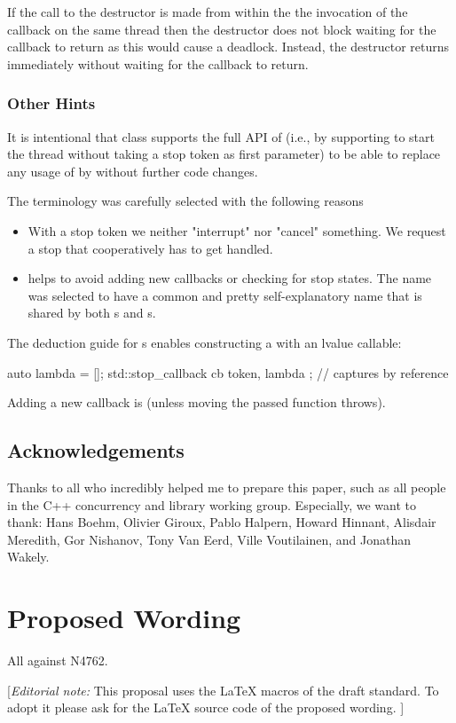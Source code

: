 If the call to the  destructor is made from within the the
invocation of the callback on the same thread then the destructor does not block
waiting for the callback to return as this would cause a deadlock. Instead,
the destructor returns immediately without waiting for the callback to return.

\subsubsection*{Other Hints}

It is intentional that class  supports the full API of 
(i.e., by supporting to start the thread without taking a stop token as first parameter)
to be able to replace any usage of  by 
without further code changes.

The terminology was carefully selected with the following reasons
\begin{itemize}
 \item With a stop token we neither "interrupt" nor "cancel" something.
        We request a stop that cooperatively has to get handled.
 \item {} helps to avoid adding new callbacks
        or checking for stop states.
        The name was selected to have a common and pretty self-explanatory name
        that is shared by both s and s.
\end{itemize}

The deduction guide for s enables
constructing a  with an lvalue callable:
\begin{codeblock}
auto lambda = []{};
std::stop_callback cb{ token, lambda };  // captures by reference
\end{codeblock}

Adding a new callback is  (unless moving the passed function throws).

\subsection*{Acknowledgements}

Thanks to all who incredibly helped me to prepare this paper, such as all people in the C++ concurrency and library working group.
Especially, we want to thank:
 Hans Boehm, Olivier Giroux, Pablo Halpern, Howard Hinnant, Alisdair Meredith, Gor Nishanov,
 Tony Van Eerd, Ville Voutilainen, and Jonathan Wakely.

\section*{Proposed Wording}
All against N4762.

{\color{blue}
[{\itshape{}Editorial note:} This proposal uses the LaTeX macros of the draft standard.
        To adopt it please ask for the LaTeX source code of the proposed wording. ]
}


